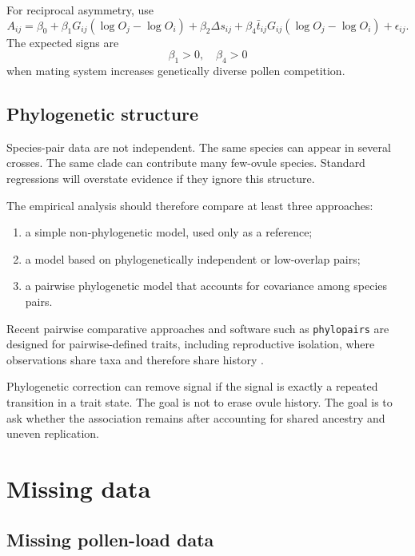 \documentclass[12pt]{article}
\begin{document}
For reciprocal asymmetry, use
\begin{equation}
A_{ij}=\beta_0+\beta_1G_{ij}(\log O_j-\log O_i)+\beta_2\Delta s_{ij}
+\beta_4\bar{t}_{ij}G_{ij}(\log O_j-\log O_i)+\epsilon_{ij}.
\label{eq:empiricalA}
\end{equation}
The expected signs are
\begin{equation}
\beta_1>0,
\quad
\beta_4>0
\end{equation}
when mating system increases genetically diverse pollen competition.

\subsection{Phylogenetic structure}

Species-pair data are not independent. The same species can appear in several crosses. The same clade can contribute many few-ovule species. Standard regressions will overstate evidence if they ignore this structure.

The empirical analysis should therefore compare at least three approaches:
\begin{enumerate}
\item a simple non-phylogenetic model, used only as a reference;
\item a model based on phylogenetically independent or low-overlap pairs;
\item a pairwise phylogenetic model that accounts for covariance among species pairs.
\end{enumerate}
Recent pairwise comparative approaches and software such as \texttt{phylopairs} are designed for pairwise-defined traits, including reproductive isolation, where observations share taxa and therefore share history \citep{Anderson2025}.

\begin{cautionbox}
Phylogenetic correction can remove signal if the signal is exactly a repeated transition in a trait state. The goal is not to erase ovule history. The goal is to ask whether the association remains after accounting for shared ancestry and uneven replication.
\end{cautionbox}

\section{Missing data}

\subsection{Missing pollen-load data}
\end{document}
